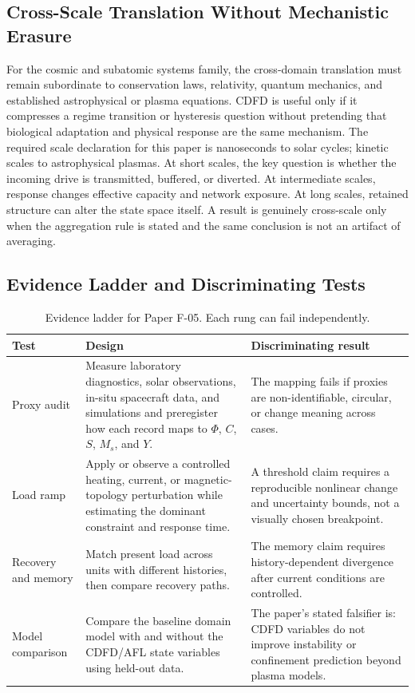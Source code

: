 \documentclass[11pt,a4paper]{article}
\begin{document}
\subsection{Cross-Scale Translation Without Mechanistic Erasure}

For the cosmic and subatomic systems family, the cross-domain translation must remain subordinate to conservation laws, relativity, quantum mechanics, and established astrophysical or plasma equations. CDFD is useful only if it compresses a regime transition or hysteresis question without pretending that biological adaptation and physical response are the same mechanism. \cite{Turing1952,Shannon1948,BakTangWiesenfeld1987}
The required scale declaration for this paper is nanoseconds to solar cycles; kinetic scales to astrophysical plasmas. At short
scales, the key question is whether the incoming drive is transmitted,
buffered, or diverted. At intermediate scales, response changes effective
capacity and network exposure. At long scales, retained structure can alter the
state space itself. A result is genuinely cross-scale only when the aggregation
rule is stated and the same conclusion is not an artifact of averaging.

\subsection{Evidence Ladder and Discriminating Tests}

\begin{table}[htbp]
\centering
\small
\caption{Evidence ladder for Paper F-05. Each rung can fail independently.}
\begin{tabularx}{\textwidth}{|p{}|X|X|}
\hline
\textbf{Test} & \textbf{Design} & \textbf{Discriminating result} \\
\hline
Proxy audit & Measure laboratory diagnostics, solar observations, in-situ spacecraft data, and simulations and preregister how each record maps to $\Phi$, $C$, $S$, $M_s$, and $Y$. & The mapping fails if proxies are non-identifiable, circular, or change meaning across cases. \\
\hline
Load ramp & Apply or observe a controlled heating, current, or magnetic-topology perturbation while estimating the dominant constraint and response time. & A threshold claim requires a reproducible nonlinear change and uncertainty bounds, not a visually chosen breakpoint. \\
\hline
Recovery and memory & Match present load across units with different histories, then compare recovery paths. & The memory claim requires history-dependent divergence after current conditions are controlled. \\
\hline
Model comparison & Compare the baseline domain model with and without the CDFD/AFL state variables using held-out data. & The paper's stated falsifier is: CDFD variables do not improve instability or confinement prediction beyond plasma models. \\
\hline
\end{tabularx}
\end{table}
\end{document}
